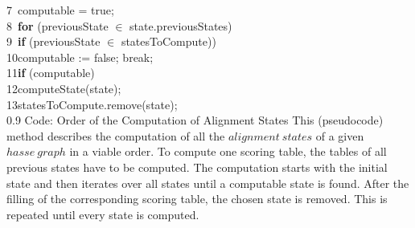 \documentclass[a4paper,10pt]{thesis}
\begin{document}
{{{{{        7\ \hspace*{2em}\hspace*{2em}\hspace*{2em}\hspace*{2em}computable = true;\\
        8\ \hspace*{2em}\hspace*{2em}\hspace*{2em}\hspace*{2em}\textbf{for} (previousState $\in$ state.previousStates)\\
        9\ \hspace*{2em}\hspace*{2em}\hspace*{2em}\hspace*{2em}\hspace*{2em}\textbf{if} (previousState $\in$ statesToCompute))\\
        10\hspace*{2em}\hspace*{2em}\hspace*{2em}\hspace*{2em}\hspace*{2em}\hspace*{2em}computable := false; break;\\
        11\hspace*{2em}\hspace*{2em}\hspace*{2em}\hspace*{2em}\textbf{if} (computable)\\
        12\hspace*{2em}\hspace*{2em}\hspace*{2em}\hspace*{2em}\hspace*{2em}computeState(state);\\
        13\hspace*{2em}\hspace*{2em}\hspace*{2em}\hspace*{2em}\hspace*{2em}statesToCompute.remove(state);\\
        }
        {0.9\columnwidth}
        {Code: Order of the Computation of Alignment States}
        {This (pseudocode) method describes the computation of all the $alignment~states$ of a given $hasse~graph$ in a viable order. To compute one scoring table, the tables of all previous states have to be computed. The computation starts with the initial state and then iterates over all states until a computable state is found. After the filling of the corresponding scoring table, the chosen state is removed. This is repeated until every state is computed.}%
}}}}
\end{document}
